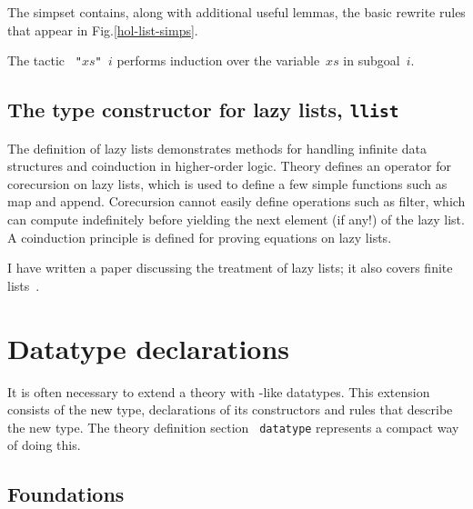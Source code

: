 The simpset  contains, along with additional useful lemmas,
the basic rewrite rules that appear in Fig.\ts\ref{hol-list-simps}.

The tactic {\tt{} "$xs$" $i$} performs induction over the
variable~$xs$ in subgoal~$i$.


\subsection{The type constructor for lazy lists, {\tt llist}}

The definition of lazy lists demonstrates methods for handling infinite
data structures and coinduction in higher-order logic.  Theory
 defines an operator for corecursion on lazy lists, which is
used to define a few simple functions such as map and append.  Corecursion
cannot easily define operations such as filter, which can compute
indefinitely before yielding the next element (if any!) of the lazy list.
A coinduction principle is defined for proving equations on lazy lists.

I have written a paper discussing the treatment of lazy lists; it also
covers finite lists~\cite{paulson-coind}.


\section{Datatype declarations}

\underscoreon

It is often necessary to extend a theory with \ML-like datatypes.  This
extension consists of the new type, declarations of its constructors and
rules that describe the new type. The theory definition section {\tt
  datatype} represents a compact way of doing this.


\subsection{Foundations}

